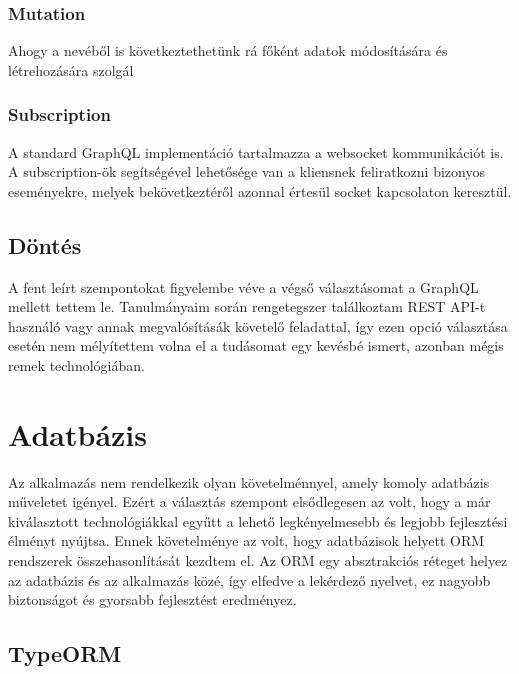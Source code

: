 \subsubsection{Mutation}
Ahogy a nevéből is következtethetünk rá főként adatok módosítására és létrehozására szolgál
  

\subsubsection{Subscription}
A standard GraphQL implementáció tartalmazza a websocket kommunikációt is. A subscription-ök segítségével lehetősége van a kliensnek feliratkozni bizonyos eseményekre, melyek bekövetkeztéről azonnal értesül socket kapcsolaton keresztül.

\subsection{Döntés}
A fent leírt szempontokat figyelembe véve a végső választásomat a GraphQL mellett tettem le.
Tanulmányaim során rengetegszer találkoztam REST API-t használó vagy annak megvalósításák követelő feladattal, így ezen opció választása esetén nem mélyítettem volna el a tudásomat egy kevésbé ismert, azonban mégis remek technológiában.

\section{Adatbázis}
Az alkalmazás nem rendelkezik olyan követelménnyel, amely komoly adatbázis műveletet igényel.
Ezért a választás szempont elsődlegesen az volt, hogy a már kiválasztott technológiákkal egyűtt a lehető legkényelmesebb és legjobb fejlesztési élményt nyújtsa. Ennek követelménye az volt, hogy adatbázisok helyett ORM rendszerek összehasonlítását kezdtem el.
Az ORM egy absztrakciós réteget helyez az adatbázis és az alkalmazás közé, így elfedve a lekérdező nyelvet, ez nagyobb biztonságot és gyorsabb fejlesztést eredményez.

\subsection{TypeORM}

